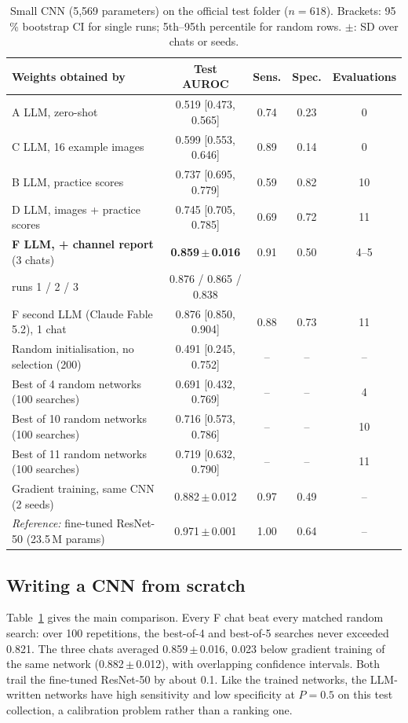 \documentclass[runningheads]{llncs}
\begin{document}
\begin{table}[t]
\centering
\caption{Small CNN (5,569 parameters) on the official test folder ($n{=}618$). Brackets: 95\,\% bootstrap CI for single runs; 5th--95th percentile for random rows. $\pm$: SD over chats or seeds.}
\label{tab:main}
\setlength{\tabcolsep}{3pt}
\scriptsize
\begin{tabular}{@{}lcccc@{}}
\toprule
Weights obtained by & Test AUROC & Sens. & Spec. & Evaluations \\
\midrule
A\; LLM, zero-shot & 0.519 [0.473, 0.565] & 0.74 & 0.23 & 0 \\
C\; LLM, 16 example images & 0.599 [0.553, 0.646] & 0.89 & 0.14 & 0 \\
B\; LLM, practice scores & 0.737 [0.695, 0.779] & 0.59 & 0.82 & 10 \\
D\; LLM, images + practice scores & 0.745 [0.705, 0.785] & 0.69 & 0.72 & 11 \\
\textbf{F\; LLM, + channel report} (3 chats) & \textbf{0.859\,$\pm$\,0.016} & 0.91 & 0.50 & 4--5 \\
\quad runs 1 / 2 / 3 & 0.876 / 0.865 / 0.838 & & & \\
F\; second LLM (Claude Fable 5.2), 1 chat & 0.876 [0.850, 0.904] & 0.88 & 0.73 & 11 \\
\midrule
Random initialisation, no selection (200) & 0.491 [0.245, 0.752] & -- & -- & -- \\
Best of 4 random networks (100 searches) & 0.691 [0.432, 0.769] & -- & -- & 4 \\
Best of 10 random networks (100 searches) & 0.716 [0.573, 0.786] & -- & -- & 10 \\
Best of 11 random networks (100 searches) & 0.719 [0.632, 0.790] & -- & -- & 11 \\
Gradient training, same CNN (2 seeds) & 0.882\,$\pm$\,0.012 & 0.97 & 0.49 & -- \\
\midrule
\emph{Reference:} fine-tuned ResNet-50 (23.5\,M params) & 0.971\,$\pm$\,0.001 & 1.00 & 0.64 & -- \\
\bottomrule
\end{tabular}
\end{table}

\subsection{Writing a CNN from scratch}
Table~\ref{tab:main} gives the main comparison.
Every F chat beat every matched random search: over 100 repetitions, the best-of-4 and best-of-5 searches never exceeded 0.821.
The three chats averaged 0.859\,$\pm$\,0.016, 0.023 below gradient training of the same network (0.882\,$\pm$\,0.012), with overlapping confidence intervals.
Both trail the fine-tuned ResNet-50 by about 0.1.
Like the trained networks, the LLM-written networks have high sensitivity and low specificity at $P{=}0.5$ on this test collection, a calibration problem rather than a ranking one.
\end{document}
